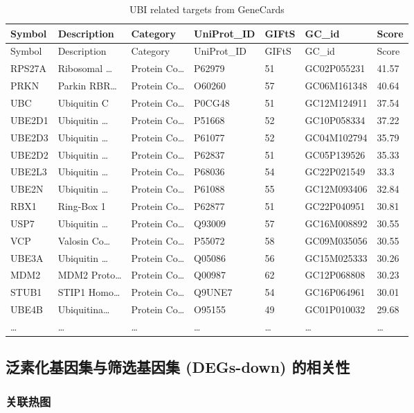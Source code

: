 \documentclass[
]{article}
\begin{document}
\begin{longtable}[]{@{}lllllll@{}}
\caption{\label{tab:UBI-related-targets-from-GeneCards}UBI related targets from GeneCards}\tabularnewline
\toprule
Symbol & Description & Category & UniProt\_ID & GIFtS & GC\_id & Score\tabularnewline
\midrule
\endfirsthead
\toprule
Symbol & Description & Category & UniProt\_ID & GIFtS & GC\_id & Score\tabularnewline
\midrule
\endhead
RPS27A & Ribosomal \ldots{} & Protein Co\ldots{} & P62979 & 51 & GC02P055231 & 41.57\tabularnewline
PRKN & Parkin RBR\ldots{} & Protein Co\ldots{} & O60260 & 57 & GC06M161348 & 40.64\tabularnewline
UBC & Ubiquitin C & Protein Co\ldots{} & P0CG48 & 51 & GC12M124911 & 37.54\tabularnewline
UBE2D1 & Ubiquitin \ldots{} & Protein Co\ldots{} & P51668 & 52 & GC10P058334 & 37.22\tabularnewline
UBE2D3 & Ubiquitin \ldots{} & Protein Co\ldots{} & P61077 & 52 & GC04M102794 & 35.79\tabularnewline
UBE2D2 & Ubiquitin \ldots{} & Protein Co\ldots{} & P62837 & 51 & GC05P139526 & 35.33\tabularnewline
UBE2L3 & Ubiquitin \ldots{} & Protein Co\ldots{} & P68036 & 54 & GC22P021549 & 33.3\tabularnewline
UBE2N & Ubiquitin \ldots{} & Protein Co\ldots{} & P61088 & 55 & GC12M093406 & 32.84\tabularnewline
RBX1 & Ring-Box 1 & Protein Co\ldots{} & P62877 & 51 & GC22P040951 & 30.81\tabularnewline
USP7 & Ubiquitin \ldots{} & Protein Co\ldots{} & Q93009 & 57 & GC16M008892 & 30.55\tabularnewline
VCP & Valosin Co\ldots{} & Protein Co\ldots{} & P55072 & 58 & GC09M035056 & 30.55\tabularnewline
UBE3A & Ubiquitin \ldots{} & Protein Co\ldots{} & Q05086 & 56 & GC15M025333 & 30.26\tabularnewline
MDM2 & MDM2 Proto\ldots{} & Protein Co\ldots{} & Q00987 & 62 & GC12P068808 & 30.23\tabularnewline
STUB1 & STIP1 Homo\ldots{} & Protein Co\ldots{} & Q9UNE7 & 54 & GC16P064961 & 30.01\tabularnewline
UBE4B & Ubiquitina\ldots{} & Protein Co\ldots{} & O95155 & 49 & GC01P010032 & 29.68\tabularnewline
\ldots{} & \ldots{} & \ldots{} & \ldots{} & \ldots{} & \ldots{} & \ldots{}\tabularnewline
\bottomrule
\end{longtable}

\hypertarget{ux6cdbux7d20ux5316ux57faux56e0ux96c6ux4e0eux7b5bux9009ux57faux56e0ux96c6-degs-down-ux7684ux76f8ux5173ux6027}{%
\subsection{泛素化基因集与筛选基因集 (DEGs-down) 的相关性}\label{ux6cdbux7d20ux5316ux57faux56e0ux96c6ux4e0eux7b5bux9009ux57faux56e0ux96c6-degs-down-ux7684ux76f8ux5173ux6027}}

\hypertarget{ux5173ux8054ux70edux56fe}{%
\subsubsection{关联热图}\label{ux5173ux8054ux70edux56fe}}
\end{document}
